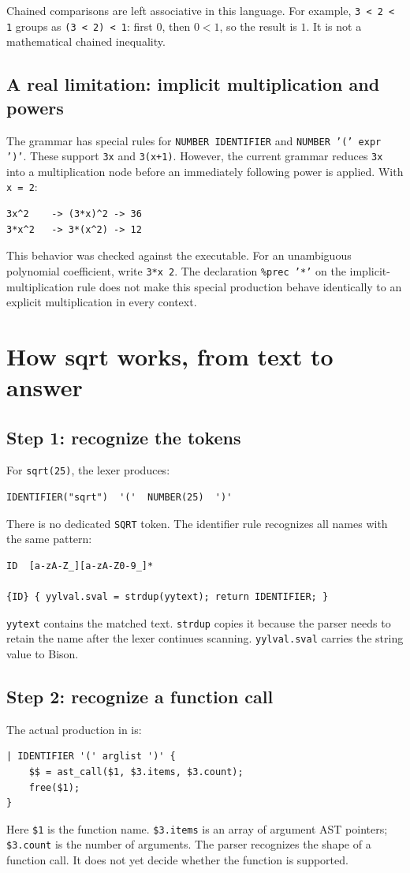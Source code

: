 \documentclass[11pt,a4paper]{report}
\newcommand{\file}[1]{\texttt{\detokenize{#1}}}
\begin{document}
Chained comparisons are left associative in this language. For example,
\texttt{3 < 2 < 1} groups as \texttt{(3 < 2) < 1}: first $0$, then $0<1$,
so the result is $1$. It is not a mathematical chained inequality.

\section{A real limitation: implicit multiplication and powers}
The grammar has special rules for \texttt{NUMBER IDENTIFIER} and
\texttt{NUMBER '(' expr ')'}. These support \texttt{3x} and \texttt{3(x+1)}.
However, the current grammar reduces \texttt{3x} into a multiplication node
before an immediately following power is applied. With \texttt{x = 2}:
\begin{lstlisting}
3x^2    -> (3*x)^2 -> 36
3*x^2   -> 3*(x^2) -> 12
\end{lstlisting}
This behavior was checked against the executable. For an unambiguous
polynomial coefficient, write \texttt{3*x 2}. The declaration
\texttt{\%prec '*'} on the implicit-multiplication rule does not make this
special production behave identically to an explicit multiplication in every context.

\chapter{How sqrt works, from text to answer}
\section{Step 1: recognize the tokens}
For \texttt{sqrt(25)}, the lexer produces:
\begin{lstlisting}
IDENTIFIER("sqrt")  '('  NUMBER(25)  ')'
\end{lstlisting}
There is no dedicated \texttt{SQRT} token. The identifier rule recognizes all
names with the same pattern:
\begin{lstlisting}
ID  [a-zA-Z_][a-zA-Z0-9_]*

{ID} { yylval.sval = strdup(yytext); return IDENTIFIER; }
\end{lstlisting}
\texttt{yytext} contains the matched text. \texttt{strdup} copies it because
the parser needs to retain the name after the lexer continues scanning.
\texttt{yylval.sval} carries the string value to Bison.

\section{Step 2: recognize a function call}
The actual production in \file{src/parser.y} is:
\begin{lstlisting}
| IDENTIFIER '(' arglist ')' {
    $$ = ast_call($1, $3.items, $3.count);
    free($1);
}
\end{lstlisting}
Here \texttt{\$1} is the function name. \texttt{\$3.items} is an array of
argument AST pointers; \texttt{\$3.count} is the number of arguments.
The parser recognizes the shape of a function call. It does not yet decide
whether the function is supported.
\end{document}
